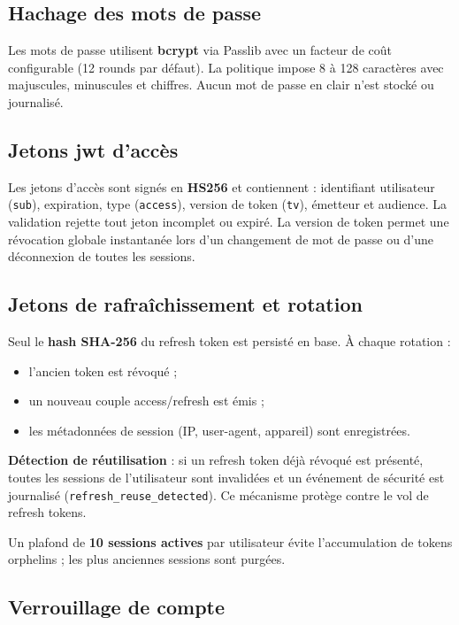 \subsection{Hachage des mots de passe}

Les mots de passe utilisent \textbf{bcrypt} via Passlib avec un facteur de coût configurable (12 rounds par défaut). La politique impose 8 à 128 caractères avec majuscules, minuscules et chiffres. Aucun mot de passe en clair n'est stocké ou journalisé.

\subsection{Jetons \gls{jwt} d'accès}

Les jetons d'accès sont signés en \textbf{HS256} et contiennent : identifiant utilisateur (\texttt{sub}), expiration, type (\texttt{access}), version de token (\texttt{tv}), émetteur et audience. La validation rejette tout jeton incomplet ou expiré. La version de token permet une révocation globale instantanée lors d'un changement de mot de passe ou d'une déconnexion de toutes les sessions.

\subsection{Jetons de rafraîchissement et rotation}

Seul le \textbf{hash SHA-256} du refresh token est persisté en base. À chaque rotation :
\begin{itemize}
  \item l'ancien token est révoqué ;
  \item un nouveau couple access/refresh est émis ;
  \item les métadonnées de session (IP, user-agent, appareil) sont enregistrées.
\end{itemize}

\textbf{Détection de réutilisation} : si un refresh token déjà révoqué est présenté, toutes les sessions de l'utilisateur sont invalidées et un événement de sécurité est journalisé (\texttt{refresh\_reuse\_detected}). Ce mécanisme protège contre le vol de refresh tokens.

Un plafond de \textbf{10 sessions actives} par utilisateur évite l'accumulation de tokens orphelins ; les plus anciennes sessions sont purgées.

\subsection{Verrouillage de compte}


